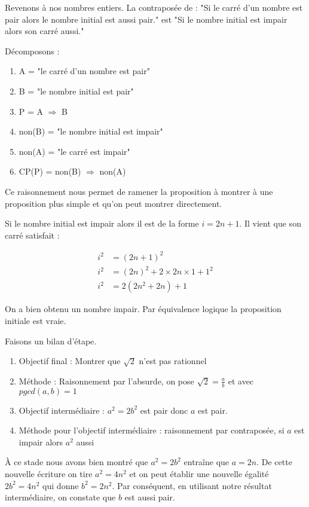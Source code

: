 \documentclass[a4paper, 11pt, twoside]{article}
\begin{document}
Revenons à nos nombres entiers. La contraposée de : "Si le carré
d'un nombre est pair alors le nombre initial est aussi pair." est
"Si le nombre initial est impair alors son carré aussi."

Décomposons :

\begin{enumerate}
\item A = "le carré d'un nombre est pair"
\item B = "le nombre initial est pair"
\item P = A \(\Rightarrow\) B
\item non(B) = "le nombre initial est impair"
\item non(A) = "le carré est impair"
\item CP(P) = non(B) \(\Rightarrow\) non(A)
\end{enumerate}


Ce raisonnement nous permet de ramener la proposition à montrer à
une proposition plus simple et qu'on peut montrer directement.

Si le nombre initial est impair alors il est de la forme \(i = 2n +
   1\). Il vient que son carré satisfait :

\begin{align*}
i^2 &= (2n + 1)^2\\
i^2 &= (2n)^2 + 2\times 2n\times 1 + 1^2\\
i^2 &= 2(2n^2 + 2n) + 1
\end{align*}

On a bien obtenu un nombre impair. Par équivalence logique la
proposition initiale est vraie.

Faisons un bilan d'étape.
\begin{enumerate}
\item Objectif final : Montrer que \(\sqrt{2}\) n'est pas rationnel
\item Méthode : Raisonnement par l'absurde, on pose \(\sqrt{2} =
     \frac{a}{b}\) et avec \(pgcd(a, b) = 1\)
\item Objectif intermédiaire : \(a^2 = 2b^2\) est pair donc \(a\) est pair.
\item Méthode pour l'objectif intermédiaire : raisonnement par
contraposée, si \(a\) est impair alors \(a^2\) aussi
\end{enumerate}

À ce stade nous avons bien montré que \(a^2 = 2b^2\) entraîne que
\(a = 2n\). De cette nouvelle écriture on tire \(a^2 = 4n^2\) et on
peut établir une nouvelle égalité \(2b^2 = 4n^2\) qui donne \(b^2 =
   2n^2\). Par conséquent, en utilisant notre résultat intermédiaire,
on constate que \(b\) est aussi pair.
\end{document}
